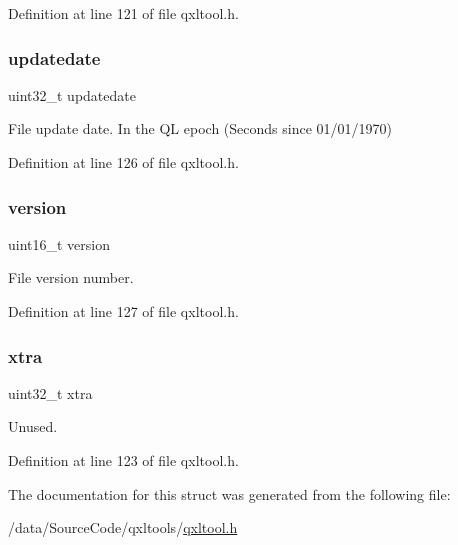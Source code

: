 Definition at line 121 of file qxltool.\+h.

\mbox{\label{struct_q_l_d_i_r_a52c3c44e31eb489b1913b30e8d1ac88f}} 
\subsubsection{\texorpdfstring{updatedate}{updatedate}}
{\footnotesize\ttfamily uint32\+\_\+t updatedate}

File update date. In the QL epoch (Seconds since 01/01/1970) 

Definition at line 126 of file qxltool.\+h.

\mbox{\label{struct_q_l_d_i_r_ab6d7b6f8c2ceaba7acda80aaf05f4899}} 
\subsubsection{\texorpdfstring{version}{version}}
{\footnotesize\ttfamily uint16\+\_\+t version}

File version number. 

Definition at line 127 of file qxltool.\+h.

\mbox{\label{struct_q_l_d_i_r_a11b4492a1b6004ab012f6a7d2525cc3c}} 
\subsubsection{\texorpdfstring{xtra}{xtra}}
{\footnotesize\ttfamily uint32\+\_\+t xtra}

Unused. 

Definition at line 123 of file qxltool.\+h.



The documentation for this struct was generated from the following file\+:\begin{DoxyCompactItemize}
\item 
/data/\+Source\+Code/qxltools/\hyperlink{qxltool_8h}{qxltool.\+h}\end{DoxyCompactItemize}
